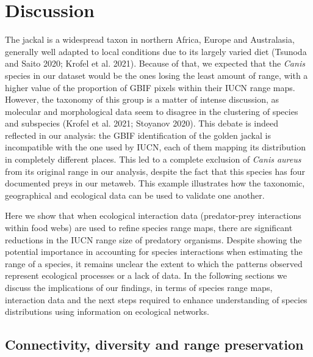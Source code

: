 \documentclass[10pt,oneside]{article}
\begin{document}
\hypertarget{discussion}{%
\section{Discussion}\label{discussion}}

The jackal is a widespread taxon in northern Africa, Europe and
Australasia, generally well adapted to local conditions due to its
largely varied diet (Tsunoda and Saito 2020; Krofel et al. 2021).
Because of that, we expected that the \emph{Canis} species in our
dataset would be the ones losing the least amount of range, with a
higher value of the proportion of GBIF pixels within their IUCN range
maps. However, the taxonomy of this group is a matter of intense
discussion, as molecular and morphological data seem to disagree in the
clustering of species and subspecies (Krofel et al. 2021; Stoyanov
2020). This debate is indeed reflected in our analysis: the GBIF
identification of the golden jackal is incompatible with the one used by
IUCN, each of them mapping its distribution in completely different
places. This led to a complete exclusion of \emph{Canis aureus} from its
original range in our analysis, despite the fact that this species has
four documented preys in our metaweb. This example illustrates how the
taxonomic, geographical and ecological data can be used to validate one
another.

Here we show that when ecological interaction data (predator-prey
interactions within food webs) are used to refine species range maps,
there are significant reductions in the IUCN range size of predatory
organisms. Despite showing the potential importance in accounting for
species interactions when estimating the range of a species, it remains
unclear the extent to which the patterns observed represent ecological
processes or a lack of data. In the following sections we discuss the
implications of our findings, in terms of species range maps,
interaction data and the next steps required to enhance understanding of
species distributions using information on ecological networks.

\hypertarget{connectivity-diversity-and-range-preservation}{%
\subsection{Connectivity, diversity and range
preservation}\label{connectivity-diversity-and-range-preservation}}
\end{document}
